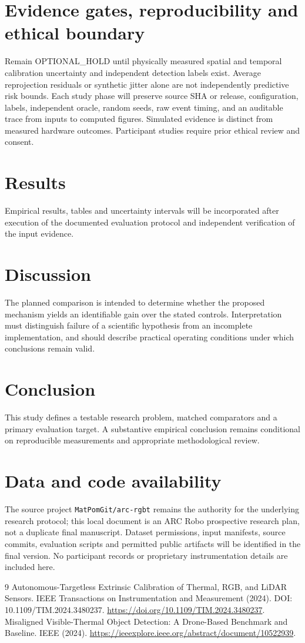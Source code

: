 \documentclass[11pt,a4paper]{article}
\begin{document}
\section{Evidence gates, reproducibility and ethical boundary}
Remain OPTIONAL\_HOLD until physically measured spatial and temporal calibration uncertainty and independent detection labels exist. Average reprojection residuals or synthetic jitter alone are not independently predictive risk bounds. Each study phase will preserve source SHA or release, configuration, labels, independent oracle, random seeds, raw event timing, and an auditable trace from inputs to computed figures. Simulated evidence is distinct from measured hardware outcomes. Participant studies require prior ethical review and consent.

\section{Results}
Empirical results, tables and uncertainty intervals will be incorporated after execution of the documented evaluation protocol and independent verification of the input evidence.

\section{Discussion}
The planned comparison is intended to determine whether the proposed mechanism yields an identifiable gain over the stated controls. Interpretation must distinguish failure of a scientific hypothesis from an incomplete implementation, and should describe practical operating conditions under which conclusions remain valid.

\section{Conclusion}
This study defines a testable research problem, matched comparators and a primary evaluation target. A substantive empirical conclusion remains conditional on reproducible measurements and appropriate methodological review.

\section{Data and code availability}
The source project \texttt{MatPomGit/arc-rgbt} remains the authority for the underlying research protocol; this local document is an ARC Robo prospective research plan, not a duplicate final manuscript. Dataset permissions, input manifests, source commits, evaluation scripts and permitted public artifacts will be identified in the final version. No participant records or proprietary instrumentation details are included here.
\begin{thebibliography}{9}
 Autonomous-Targetless Extrinsic Calibration of Thermal, RGB, and LiDAR Sensors. IEEE Transactions on Instrumentation and Measurement (2024). DOI: 10.1109/TIM.2024.3480237. \url{https://doi.org/10.1109/TIM.2024.3480237}.
 Misaligned Visible-Thermal Object Detection: A Drone-Based Benchmark and Baseline. IEEE (2024). \url{https://ieeexplore.ieee.org/abstract/document/10522939}.
\end{thebibliography}
\end{document}
